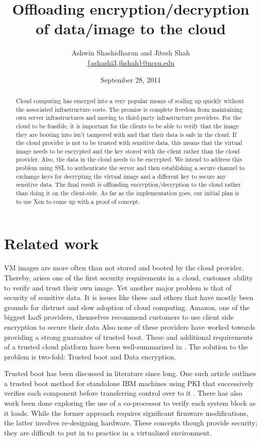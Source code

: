 \documentclass[10pt,twocolumn,pdftex]{article}
\title{Offloading encryption/decryption of data/image to the cloud}
\author{Ashwin Shashidharan and Jitesh Shah \\
\url{{ashashi3,jhshah}@ncsu.edu}
}
\date{September 28, 2011}
\begin{document}
\maketitle

\begin{abstract}
Cloud computing has emerged into a very popular \cite{adoption-survey} means of scaling up quickly without the associated infrastructure costs. The promise is complete freedom from maintaining own server infrastructures and moving to third-party infrastructure providers. For the cloud to be feasible, it is important for the clients to be able to verify that the image they are booting into isn't tampered with and that their data is safe in the cloud. If the cloud provider is not to be trusted with sensitive data, this means that the virtual image needs to be encrypted and the key stored with the client rather than the cloud provider. Also, the data in the cloud needs to be encrypted. We intend to address this problem using SSL to authenticate the server and then establishing a secure channel to exchange keys for decrypting the virtual image and a different key to secure any sensitive data. The final result is offloading encryption/decryption to the cloud rather than doing it on the client-side. As far as the implementation goes, our initial plan is to use Xen \cite{Barham:2003:XAV:945445.945462} to come up with a proof of concept.
\end{abstract}

\newpage
\mbox{}
\newpage
\section*{Related work}
VM images are more often than not stored and booted by the cloud provider.  Thereby, arises one of the first security requirements in a cloud, customer ability to verify and trust their own image. Yet another major problem is that of security of sensitive data. It is issues like these and others that have mostly been grounds for distrust and slow adoption of cloud computing. Amazon, one of the biggest IaaS providers, themselves recommend customers to use client side encryption to secure their data \cite{Amazon-web-services} Also none of these providers have worked towards providing a strong guarantee of trusted boot. These and additional requirements of a trusted cloud platform have been well-summarized in \cite{Schiffman:2010:SCT:1866835.1866843}. The solution to the problem is two-fold: Trusted boot and Data encryption.

Trusted boot has been discussed in literature since long. One such article outlines a trusted boot method for standalone IBM machines using PKI that successively verifies each component before transferring control over to it \cite{Arbaugh:1997:SRB:882493.884371}. There has also work been done exploring the use of a co-processor to verify each system block as it loads\cite{Tygar91dyad:a}. While the former approach requires significant firmware modifications, the latter involves re-designing hardware. These concepts though provide security; they are difficult to put in to practice in a virtualized environment.
\end{document}
